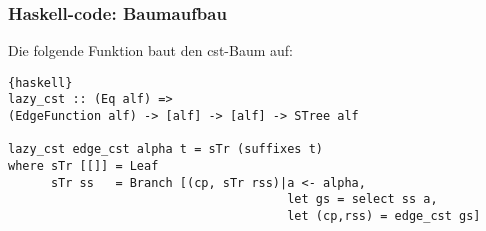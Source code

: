 \documentclass{beamer}
\begin{document}
\begin{frame}[fragile]
\frametitle{Haskell-code: Baumaufbau}
Die folgende Funktion baut den cst-Baum auf:
\begin{lstlisting}{haskell}
lazy_cst :: (Eq alf) => 
(EdgeFunction alf) -> [alf] -> [alf] -> STree alf

lazy_cst edge_cst alpha t = sTr (suffixes t)
where sTr [[]] = Leaf
      sTr ss   = Branch [(cp, sTr rss)|a <- alpha,
                                       let gs = select ss a,
                                       let (cp,rss) = edge_cst gs]
\end{lstlisting}
\end{frame}

\begin{frame}
    
\end{frame}
\end{document}
